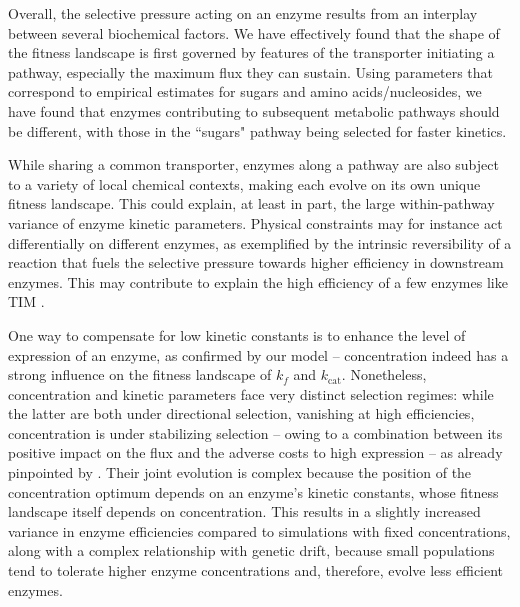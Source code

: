 Overall, the selective pressure acting on an enzyme results from an interplay between several biochemical factors. We have effectively found that the shape of the fitness landscape is first governed by features of the transporter initiating a pathway, especially the maximum flux they can sustain. Using parameters that correspond to empirical estimates for sugars and amino acids/nucleosides, we have found that enzymes contributing to subsequent metabolic pathways should be different, with those in the ``sugars" pathway being selected for faster kinetics.

While sharing a common transporter, enzymes along a pathway are also subject to a variety of local chemical contexts, making each evolve on its own unique fitness landscape. This could explain, at least in part, the large within-pathway variance of enzyme kinetic parameters. Physical constraints may for instance act differentially on different enzymes, as exemplified by the intrinsic reversibility of a reaction that fuels the selective pressure towards higher efficiency in downstream enzymes. This may contribute to explain the high efficiency of a few enzymes like TIM %
\citep{Williamson67,Davidi18}.

One way to compensate for low kinetic constants is to enhance the level of expression of an enzyme, as confirmed by our model -- concentration indeed has a strong influence on the fitness landscape of $k_f$ and $k_\text{cat}$. Nonetheless, concentration and kinetic parameters face very distinct selection regimes: while the latter are both under directional selection, vanishing at high efficiencies, concentration is under stabilizing selection -- owing to a combination between its positive impact on the flux and the adverse costs to high expression -- as already pinpointed by \citet{Chou14}. Their joint evolution is complex because the position of the concentration optimum depends on an enzyme's kinetic constants, whose fitness landscape itself depends on concentration. This results in a slightly increased variance in enzyme efficiencies compared to simulations with fixed concentrations, along with a complex relationship with genetic drift, because small populations tend to tolerate higher enzyme concentrations and, therefore, evolve less efficient enzymes.

